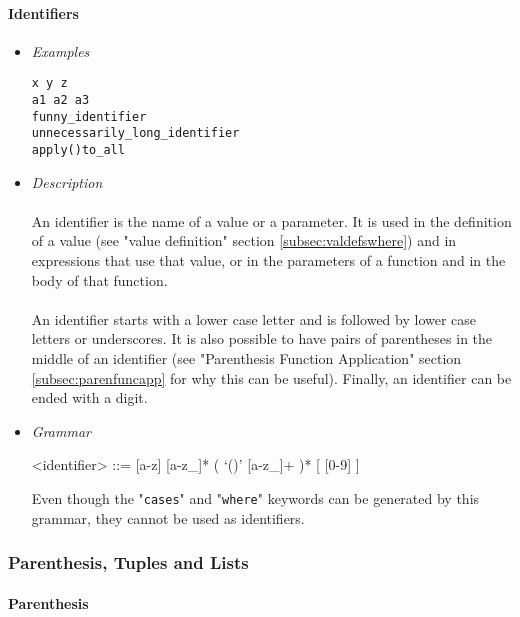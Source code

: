 \documentclass{article}
\begin{document}
\paragraph{Identifiers}
\begin{itemize}

\item \textit{Examples}
\begin{verbatim}
x y z
a1 a2 a3 
funny_identifier 
unnecessarily_long_identifier
apply()to_all
\end{verbatim}

\item \textit{Description} \\\\
An identifier is the name of a value or a parameter. It is used in the
definition of a value (see "value definition" section
\ref{subsec:valdefswhere}) and in expressions that use that value, or in the
parameters of a function and in the body of that function.
\\\\
An identifier starts with a lower case letter and is followed by lower case
letters or underscores. It is also possible to have pairs of parentheses in the
middle of an identifier (see "Parenthesis Function Application" section
\ref{subsec:parenfuncapp} for why this can be useful).  Finally, an identifier
can be ended with a digit.

\item \textit{Grammar}
\begin{grammar}
<identifier> ::= [a-z] [a-z_]* ( `()' [a-z_]+ )* [ [0-9] ]
\end{grammar}
Even though the "\texttt{cases}" and "\texttt{where}" keywords can be generated
by this grammar, they cannot be used as identifiers.

\end{itemize}

\newpage
\subsubsection{Parenthesis, Tuples and Lists}

\paragraph{Parenthesis}
\end{document}
